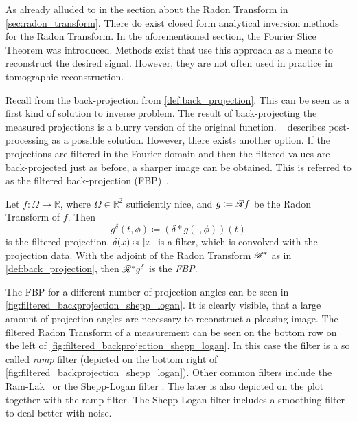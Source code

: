 As already alluded to in the section about the Radon Transform in \autoref{sec:radon_transform}.
There do exist closed form analytical inversion methods for the Radon Transform. In the
aforementioned section, the Fourier Slice Theorem was introduced. Methods exist that use this
approach as a means to reconstruct the desired signal. However, they are not often used in practice
in tomographic reconstruction.

Recall from the back-projection from \autoref{def:back_projection}. This can be seen as a first kind
of solution to inverse problem. The result of back-projecting the measured projections is a blurry
version of the original function. \citeauthor{buzug_computed_2008}~\cite{buzug_computed_2008}
describes post-processing as a possible solution. However, there exists another option. If the
projections are filtered in the Fourier domain and then the filtered values are back-projected just
as before, a sharper image can be obtained. This is referred to as the filtered back-projection
(FBP)~\cite{ramachandran_three-dimensional_1971}.

\begin{definition}\label{def:filtered_back_projection}
	Let \(f\colon \Omega \to \mathbb{R}\), where \(\Omega \in \mathbb{R}^2\) sufficiently nice,
	and \(g \coloneq \mathscr{R} f\) be the Radon Transform of \(f\). Then
	\[ g^\delta(t, \phi) \coloneq (\delta \ast g(\cdot, \phi))(t) \]
	is the filtered projection. \(\delta(x) \approx \lvert x\rvert\) is a filter, which is convolved
	with the projection data. With the adjoint of the Radon Transform \(\mathscr{R}^\ast\) as in
	\autoref{def:back_projection}, then \(\mathscr{R}^\ast g^\delta\) is the \textit{\gls{FBP}}.
\end{definition}

The \gls{FBP} for a different number of projection angles can be seen in
\autoref{fig:filtered_backprojection_shepp_logan}. It is clearly visible, that a large amount of
projection angles are necessary to reconstruct a pleasing image. The filtered Radon Transform of a
measurement can be seen on the bottom row on the left of
\autoref{fig:filtered_backprojection_shepp_logan}. In this case the filter is a so called
\textit{ramp} filter (depicted on the bottom right of
\autoref{fig:filtered_backprojection_shepp_logan}). Other common filters include the
Ram-Lak~\cite{ramachandran_three-dimensional_1971} or the Shepp-Logan filter
\cite{shepp_fourier_1974}. The later is also depicted on the plot together with the ramp filter. The
Shepp-Logan filter includes a smoothing filter to deal better with noise.

